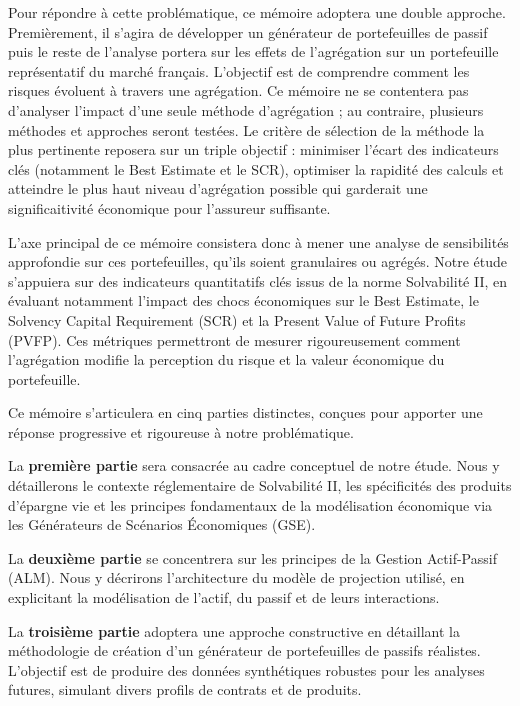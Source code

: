 Pour répondre à cette problématique, ce mémoire adoptera une double approche. Premièrement, il s'agira de développer un générateur de portefeuilles de passif puis le reste de l'analyse portera sur les effets de l'agrégation sur un portefeuille représentatif du marché français. L'objectif est de comprendre comment les risques évoluent à travers une agrégation. Ce mémoire ne se contentera pas d'analyser l'impact d'une seule méthode d'agrégation ; au contraire, plusieurs méthodes et approches seront testées. Le critère de sélection de la méthode la plus pertinente reposera sur un triple objectif : minimiser l'écart des indicateurs clés (notamment le Best Estimate et le SCR), optimiser la rapidité des calculs et atteindre le plus haut niveau d'agrégation possible qui garderait une significaitivité économique pour l'assureur suffisante.

L'axe principal de ce mémoire consistera donc à mener une analyse de sensibilités approfondie sur ces portefeuilles, qu'ils soient granulaires ou agrégés. Notre étude s'appuiera sur des indicateurs quantitatifs clés issus de la norme Solvabilité II, en évaluant notamment l'impact des chocs économiques sur le Best Estimate, le Solvency Capital Requirement (SCR) et la Present Value of Future Profits (PVFP). Ces métriques permettront de mesurer rigoureusement comment l'agrégation modifie la perception du risque et la valeur économique du portefeuille.

Ce mémoire s'articulera en cinq parties distinctes, conçues pour apporter une réponse progressive et rigoureuse à notre problématique.

La \textbf{première partie} sera consacrée au cadre conceptuel de notre étude. Nous y détaillerons le contexte réglementaire de Solvabilité II, les spécificités des produits d'épargne vie et les principes fondamentaux de la modélisation économique via les Générateurs de Scénarios Économiques (GSE).

La \textbf{deuxième partie} se concentrera sur les principes de la Gestion Actif-Passif (ALM). Nous y décrirons l'architecture du modèle de projection utilisé, en explicitant la modélisation de l'actif, du passif et de leurs interactions.

La \textbf{troisième partie} adoptera une approche constructive en détaillant la méthodologie de création d'un générateur de portefeuilles de passifs réalistes. L'objectif est de produire des données synthétiques robustes pour les analyses futures, simulant divers profils de contrats et de produits.

